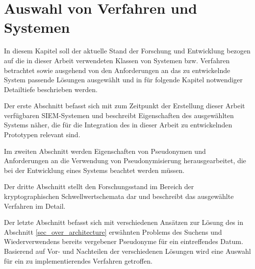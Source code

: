 \chapter{Auswahl von Verfahren und Systemen}

\label{cha_state}

In diesem Kapitel soll der aktuelle Stand der Forschung und Entwicklung bezogen auf die in dieser Arbeit verwendeten Klassen von Systemen bzw. Verfahren betrachtet sowie ausgehend von den Anforderungen an das zu entwickelnde System passende Lösungen ausgewählt und in für folgende Kapitel notwendiger Detailtiefe beschrieben werden. 

Der erste Abschnitt befasst sich mit zum Zeitpunkt der Erstellung dieser Arbeit verfügbaren SIEM-Systemen und beschreibt Eigenschaften des ausgewählten Systems näher, die für die Integration des in dieser Arbeit zu entwickelnden Prototypen relevant sind.

Im zweiten Abschnitt werden Eigenschaften von Pseudonymen und Anforderungen an die Verwendung von Pseudonymisierung herausgearbeitet, die bei der Entwicklung eines Systems beachtet werden müssen.

Der dritte Abschnitt stellt den Forschungsstand im Bereich der kryptographischen Schwellwertschemata dar und beschreibt das ausgewählte Verfahren im Detail.

Der letzte Abschnitt befasst sich mit verschiedenen Ansätzen zur Lösung des in Abschnitt \ref{sec_over_architecture} erwähnten Problems des Suchens und Wiederverwendens bereits vergebener Pseudonyme für ein eintreffendes Datum. Basierend auf Vor- und Nachteilen der verschiedenen Lösungen wird eine Auswahl für ein zu implementierendes Verfahren getroffen.  







